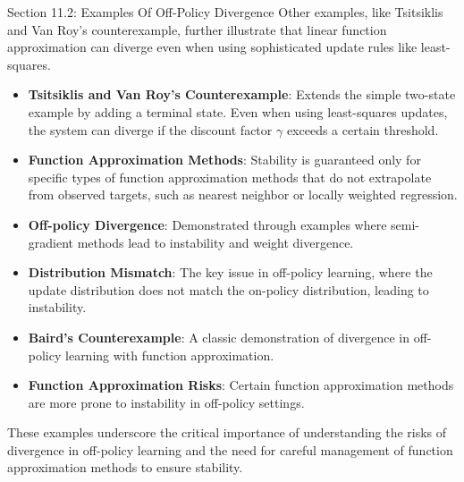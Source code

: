 \begin{notes}{Section 11.2: Examples Of Off-Policy Divergence}
    Other examples, like Tsitsiklis and Van Roy's counterexample, further illustrate that linear function approximation can diverge even when using sophisticated update rules like least-squares.
    
    \begin{highlight}
    
        \begin{itemize}
            \item \textbf{Tsitsiklis and Van Roy's Counterexample}: Extends the simple two-state example by adding a terminal state. Even when using least-squares updates, the system can diverge if the 
            discount factor $\gamma$ exceeds a certain threshold.
            \item \textbf{Function Approximation Methods}: Stability is guaranteed only for specific types of function approximation methods that do not extrapolate from observed targets, such as nearest 
            neighbor or locally weighted regression.
        \end{itemize}
    
    \end{highlight}
    
    \begin{highlight}
    
        \begin{itemize}
            \item \textbf{Off-policy Divergence}: Demonstrated through examples where semi-gradient methods lead to instability and weight divergence.
            \item \textbf{Distribution Mismatch}: The key issue in off-policy learning, where the update distribution does not match the on-policy distribution, leading to instability.
            \item \textbf{Baird's Counterexample}: A classic demonstration of divergence in off-policy learning with function approximation.
            \item \textbf{Function Approximation Risks}: Certain function approximation methods are more prone to instability in off-policy settings.
        \end{itemize}
    
        These examples underscore the critical importance of understanding the risks of divergence in off-policy learning and the need for careful management of function approximation methods to ensure stability.
    
    \end{highlight}
\end{notes}

